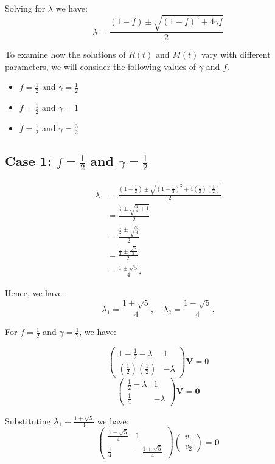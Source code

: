 \documentclass [a4paper]{article}
\begin{document}
   Solving for \(\lambda\) we have: \\
   \[
   \lambda = \frac{(1 - f) \pm \sqrt{(1 - f)^2 + 4 \gamma f}}{2}
   \]

To examine how the solutions of \( R(t) \) and \( M(t) \) vary with different parameters, we will consider the following values of \( \gamma \) and \( f \).
   \begin{itemize}
       \item \( f = \frac{1}{2} \) and \( \gamma = \frac{1}{2} \)
       \item \( f = \frac{1}{2} \) and \( \gamma = 1 \)
       \item \( f = \frac{1}{2}\) and \( \gamma = \frac{3}{2} \)
   \end{itemize}
\subsection*{Case 1: \( f = \frac{1}{2} \) and \( \gamma = \frac{1}{2} \)}

\begin{align*}
   \lambda &= \frac{\left(1 - \frac{1}{2}\right) \pm \sqrt{\left(1 - \frac{1}{2}\right)^2 + 4 \left(\frac{1}{2}\right) \left(\frac{1}{2}\right)}}{2} \\
   &= \frac{\frac{1}{2} \pm \sqrt{\frac{1}{4} + 1}}{2} \\
   &= \frac{\frac{1}{2} \pm \sqrt{\frac{5}{4}}}{2} \\
   &= \frac{\frac{1}{2} \pm \frac{\sqrt{5}}{2}}{2} \\
   &= \frac{1 \pm \sqrt{5}}{4}.
\end{align*}

Hence, we have: 
   \[
   \lambda_1 = \frac{1 + \sqrt{5}}{4}, \quad \lambda_2 = \frac{1 - \sqrt{5}}{4}.
   \]

For \(f = \frac{1}{2}\) and \(\gamma = \frac{1}{2}\), we have: 

\[
     \begin{pmatrix} 1 - \frac{1}{2} - \lambda & 1 \\ \left(\frac{1}{2}\right) \left(\frac{1}{2}\right) & -\lambda \end{pmatrix}\mathbf{V} = 0
\]
\[
\begin{pmatrix} \frac{1}{2} - \lambda & 1 \\ \frac{1}{4} & -\lambda \end{pmatrix} \mathbf{V} = \mathbf{0}
\]


Substituting \(\lambda_1 = \frac{1 + \sqrt{5}}{4}\) we have:
\[
\begin{pmatrix} \frac{1 - \sqrt{5}}{4} & 1 \\ \frac{1}{4} & -\frac{1 + \sqrt{5}}{4} \end{pmatrix} \begin{pmatrix} v_1 \\ v_2 \end{pmatrix} = \textbf{0}
\]
\end{document}
